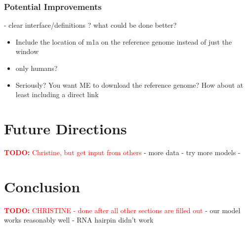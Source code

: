 \documentclass[paper=a4, fontsize=11pt]{scrartcl}
\numberwithin{equation}{section}    %
\numberwithin{figure}{section}      %
\numberwithin{table}{section}       %
\newcommand{\TODO}[1]{\textcolor{red}{\textbf{TODO: } #1}}
\numberwithin{equation}{section}    %
\numberwithin{figure}{section}      %
\numberwithin{table}{section}       %
\begin{document}
\subsubsection{Potential Improvements}
- clear interface/definitions ? what could be done better?

\begin{itemize}
	\item Include the location of m1a on the reference genome instead of just the window
    \item only humans?
    \item Seriously? You want ME to download the reference genome? How about at least including a direct link
    
\end{itemize}


\section{Future Directions}

\TODO{Christine, but get input from others}
- more data
- try more models
- 


\section{Conclusion}

\TODO{CHRISTINE - done after all other sections are filled out}
- our model works reasonably well
- RNA hairpin didn't work



\end{document}
